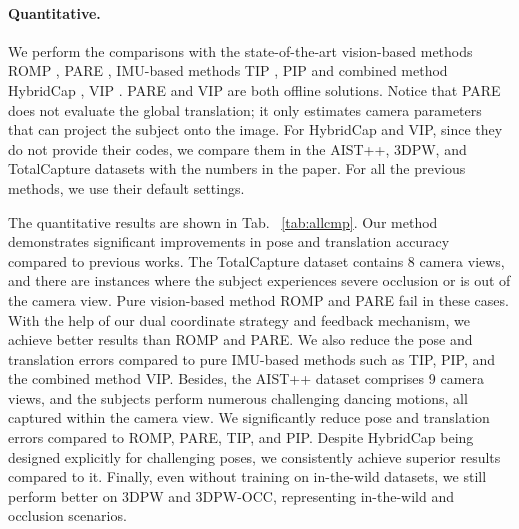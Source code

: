 \documentclass[sigconf,nonacm=true]{acmart}
\begin{document}
\paragraph{Quantitative.}
We perform the comparisons with the state-of-the-art vision-based methods ROMP \cite{ROMP}, PARE \cite{PARE}, IMU-based methods TIP \cite{TIP}, PIP \cite{PIP} and combined method HybridCap \cite{HybridCap}, VIP \cite{VIP}.
PARE and VIP are both offline solutions.
Notice that PARE does not evaluate the global translation; it only estimates camera parameters that can project the subject onto the image.
For HybridCap and VIP, since they do not provide their codes, we compare them in the AIST++, 3DPW, and TotalCapture datasets with the numbers in the paper.
For all the previous methods, we use their default settings.
\par
The quantitative results are shown in Tab. ~\ref{tab:allcmp}.
Our method demonstrates significant improvements in pose and translation accuracy compared to previous works.
The TotalCapture dataset contains 8 camera views, and there are instances where the subject experiences severe occlusion or is out of the camera view.
Pure vision-based method ROMP and PARE fail in these cases.
With the help of our dual coordinate strategy and feedback mechanism, we achieve better results than ROMP and PARE.
We also reduce the pose and translation errors compared to pure IMU-based methods such as TIP, PIP, and the combined method VIP.
Besides, the AIST++ dataset comprises 9 camera views, and the subjects perform numerous challenging dancing motions, all captured within the camera view.
We significantly reduce pose and translation errors compared to ROMP, PARE, TIP, and PIP.
Despite HybridCap being designed explicitly for challenging poses, we consistently achieve superior results compared to it.
Finally, even without training on in-the-wild datasets, we still perform better on 3DPW and 3DPW-OCC, representing in-the-wild and occlusion scenarios.
\end{document}
